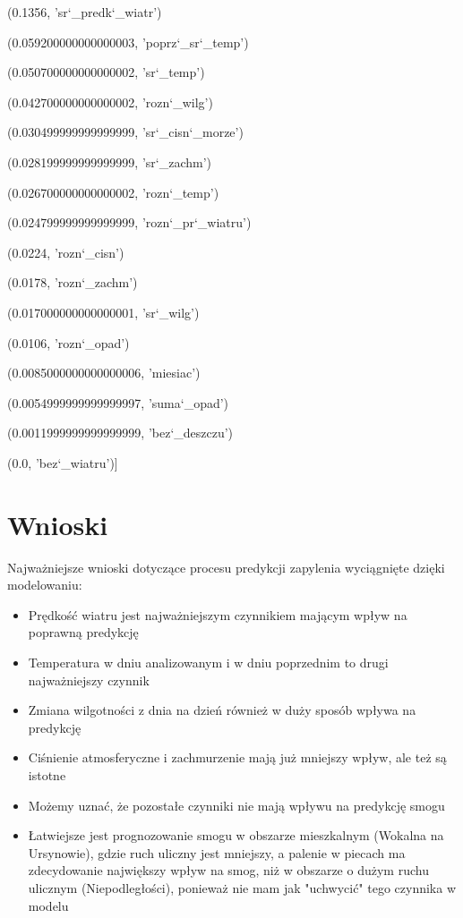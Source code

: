 \documentclass[a4paper,12pt,twoside,openany]{report}
\begin{document}
(0.1356, 'sr\char`_predk\char`_wiatr')

(0.059200000000000003, 'poprz\char`_sr\char`_temp')

(0.050700000000000002, 'sr\char`_temp')

(0.042700000000000002, 'rozn\char`_wilg')

(0.030499999999999999, 'sr\char`_cisn\char`_morze')

(0.028199999999999999, 'sr\char`_zachm')

(0.026700000000000002, 'rozn\char`_temp')

(0.024799999999999999, 'rozn\char`_pr\char`_wiatru')

(0.0224, 'rozn\char`_cisn')

(0.0178, 'rozn\char`_zachm')

(0.017000000000000001, 'sr\char`_wilg')

(0.0106, 'rozn\char`_opad')

(0.0085000000000000006, 'miesiac')

(0.0054999999999999997, 'suma\char`_opad')

(0.0011999999999999999, 'bez\char`_deszczu')

(0.0, 'bez\char`_wiatru')]

\section{Wnioski}

Najważniejsze wnioski dotyczące procesu predykcji zapylenia wyciągnięte dzięki modelowaniu:

\begin{itemize}
	\item Prędkość wiatru jest najważniejszym czynnikiem mającym wpływ na poprawną predykcję
	\item Temperatura w dniu analizowanym i w dniu poprzednim to drugi najważniejszy czynnik
	\item Zmiana wilgotności z dnia na dzień również w duży sposób wpływa na predykcję
	\item Ciśnienie atmosferyczne i zachmurzenie mają już mniejszy wpływ, ale też są istotne
	\item Możemy uznać, że pozostałe czynniki nie mają wpływu na predykcję smogu
	\item Łatwiejsze jest prognozowanie smogu w obszarze mieszkalnym (Wokalna na Ursynowie), gdzie ruch uliczny jest mniejszy, a palenie w piecach ma zdecydowanie największy wpływ na smog, niż w obszarze o dużym ruchu ulicznym (Niepodległości), ponieważ nie mam jak "uchwycić" tego czynnika w modelu
\end{itemize}
\end{document}

